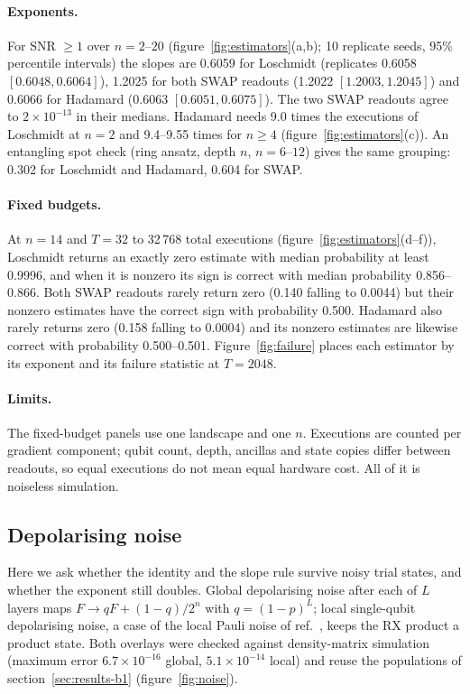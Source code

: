 \paragraph{Exponents.} For SNR $\ge 1$ over $n = 2$--$20$ (figure~\ref{fig:estimators}(a,b); 10 replicate seeds,
95\% percentile intervals) the slopes are 0.6059 for Loschmidt (replicates 0.6058 $[0.6048, 0.6064]$), 1.2025 for both
SWAP readouts (1.2022 $[1.2003, 1.2045]$) and 0.6066 for Hadamard (0.6063 $[0.6051, 0.6075]$). The two SWAP readouts
agree to $2\times10^{-13}$ in their medians. Hadamard needs 9.0 times the executions of Loschmidt at $n = 2$ and
9.4--9.55 times for $n \ge 4$ (figure~\ref{fig:estimators}(c)). An entangling spot check (ring ansatz, depth $n$,
$n = 6$--$12$) gives the same grouping: 0.302 for Loschmidt and Hadamard, 0.604 for SWAP.

\paragraph{Fixed budgets.} At $n = 14$ and $T = 32$ to 32\,768 total executions (figure~\ref{fig:estimators}(d--f)),
Loschmidt returns an exactly zero estimate with median probability at least 0.9996, and when it is nonzero its sign is
correct with median probability 0.856--0.866. Both SWAP readouts rarely return zero (0.140 falling to 0.0044) but
their nonzero estimates have the correct sign with probability 0.500. Hadamard also rarely returns zero (0.158 falling
to 0.0004) and its nonzero estimates are likewise correct with probability 0.500--0.501. Figure~\ref{fig:failure}
places each estimator by its exponent and its failure statistic at $T = 2048$.

\paragraph{Limits.} The fixed-budget panels use one landscape and one $n$. Executions are counted per gradient
component; qubit count, depth, ancillas and state copies differ between readouts, so equal executions do not mean
equal hardware cost. All of it is noiseless simulation.

\subsection{Depolarising noise}
\label{sec:results-b4}

Here we ask whether the identity and the slope rule survive noisy trial states, and whether the exponent still
doubles.
Global depolarising noise after each of $L$ layers maps $F \to qF + (1-q)/2^n$ with $q = (1-p)^L$; local single-qubit
depolarising noise, a case of the local Pauli noise of ref.~\cite{wang2021}, keeps the RX product a product state. Both overlays were checked against density-matrix simulation
(maximum error $6.7\times10^{-16}$ global, $5.1\times10^{-14}$ local) and reuse the populations of section~\ref{sec:results-b1}
(figure~\ref{fig:noise}).

